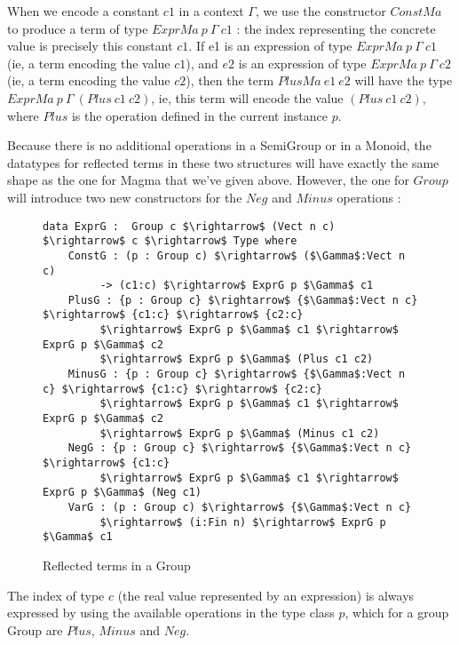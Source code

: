 When we encode a constant $c1$ in a context $\Gamma$, we use the constructor $ConstMa$ to produce a term of type $ExprMa\ p\ \Gamma\ c1$ : the index representing the concrete value is precisely this constant $c1$.
If e1 is an expression of type $ExprMa\ p\ \Gamma\ c1$ (ie, a term encoding the value $c1$), and $e2$ is an expression of type $ExprMa\ p\ \Gamma\ c2$ (ie, a term encoding the value $c2$), then the term $PlusMa\ e1\ e2$ will have the type $ExprMa\ p\ \Gamma\ (Plus\ c1\ c2)$, ie, this term will encode the value $(Plus\ c1\ c2)$, where $Plus$ is the operation defined in the current instance $p$.


Because there is no additional operations in a SemiGroup or in a Monoid, the datatypes for reflected terms in these two structures will have exactly the same shape as the one for Magma that we've given above.
However, the one for $Group$ will introduce two new constructors for the $Neg$ and $Minus$ operations :


\begin{figure}[H]
\figrule
\begin{center}
\begin{lstlisting}
data ExprG :  Group c $\rightarrow$ (Vect n c) $\rightarrow$ c $\rightarrow$ Type where
    ConstG : (p : Group c) $\rightarrow$ ($\Gamma$:Vect n c) 
         -> (c1:c) $\rightarrow$ ExprG p $\Gamma$ c1
    PlusG : {p : Group c} $\rightarrow$ {$\Gamma$:Vect n c} $\rightarrow$ {c1:c} $\rightarrow$ {c2:c} 
         $\rightarrow$ ExprG p $\Gamma$ c1 $\rightarrow$ ExprG p $\Gamma$ c2 
         $\rightarrow$ ExprG p $\Gamma$ (Plus c1 c2)
    MinusG : {p : Group c} $\rightarrow$ {$\Gamma$:Vect n c} $\rightarrow$ {c1:c} $\rightarrow$ {c2:c} 
         $\rightarrow$ ExprG p $\Gamma$ c1 $\rightarrow$ ExprG p $\Gamma$ c2 
         $\rightarrow$ ExprG p $\Gamma$ (Minus c1 c2)
    NegG : {p : Group c} $\rightarrow$ {$\Gamma$:Vect n c} $\rightarrow$ {c1:c} 
         $\rightarrow$ ExprG p $\Gamma$ c1 $\rightarrow$ ExprG p $\Gamma$ (Neg c1)
    VarG : (p : Group c) $\rightarrow$ {$\Gamma$:Vect n c} 
         $\rightarrow$ (i:Fin n) $\rightarrow$ ExprG p $\Gamma$ c1
\end{lstlisting}
\end{center}
\caption{Reflected terms in a Group}
\label{ExprG}
\figrule
\end{figure}

The index of type $c$ (the real value represented by an expression) is always expressed by using the available operations in the type class $p$, which for a group Group are $Plus$, $Minus$ and $Neg$.

